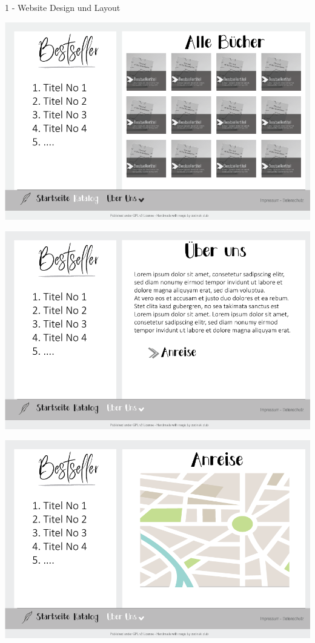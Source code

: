 \documentclass[a4paper]{article}
\begin{document}
\begin{exercise}{1 - Website Design und Layout}
\begin{center}
 \includegraphics[scale=0.5]{../2_bookstore_store.png}
\end{center}
\begin{center}
 \includegraphics[scale=0.5]{../3_bookstore_about.png}
\end{center}
\begin{center}
 \includegraphics[scale=0.5]{../4_bookstore_route.png}
\end{center}


\end{exercise}
\end{document}
